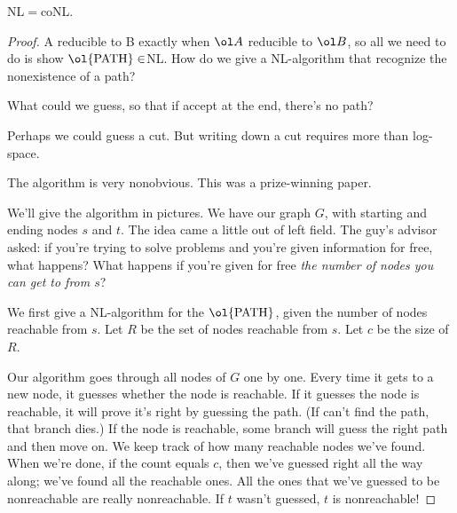 \begin{thm}
NL$=$coNL.
\end{thm}
\begin{proof}
A reducible to B exactly when $\ol A$ reducible to $\ol B$, so all we need to do is show $\ol{\text{PATH}}\in$NL. How do we give a NL-algorithm that recognize the nonexistence of a path?

What could we guess, so that if accept at the end, there's no path?

Perhaps we could guess a cut. But writing down a cut requires more than log-space.

The algorithm is very nonobvious. %
This was a prize-winning paper. %

We'll give the algorithm in pictures. We have our graph $G$, with starting and ending nodes $s$ and $t$. The idea came a little out of left field. The guy's advisor asked: if you're trying to solve problems and you're given information for free, what happens? What happens if you're given for free {\it the number of nodes you can get to from $s$}?

We first give a NL-algorithm for the $\ol{\text{PATH}}$, given the number of nodes reachable from $s$. Let $R$ be the set of nodes reachable from $s$. Let $c$ be the size of $R$.


Our algorithm goes through all nodes of $G$ one by one. Every time it gets to a new node, it guesses whether the node is reachable. If it guesses the node is reachable, it will prove it's right by guessing the path. (If can't find the path, that branch dies.) If the node is reachable, some branch will guess the right path and then move on. We keep track of how many reachable nodes we've found.
When we're done, if the count equals $c$, then we've guessed right all the way along; we've found all the reachable ones. All the ones that we've guessed to be nonreachable are really nonreachable. If $t$ wasn't guessed, $t$ is nonreachable!



\end{proof}
